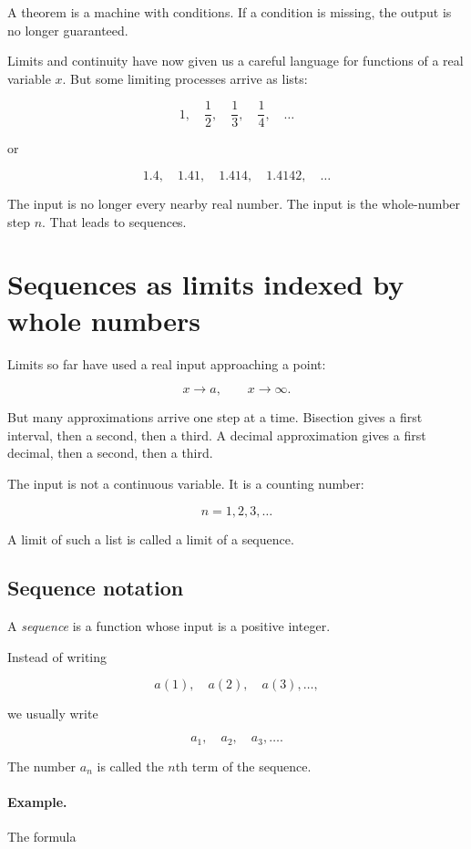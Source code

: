 A theorem is a machine with conditions.  If a condition is missing, the output is no longer guaranteed.

Limits and continuity have now given us a careful language for functions of a real variable \(x\).  But some limiting processes arrive as lists:

\[
1,\quad \frac12,\quad \frac13,\quad \frac14,\quad \ldots
\]

or

\[
1.4,\quad 1.41,\quad 1.414,\quad 1.4142,\quad \ldots
\]

The input is no longer every nearby real number.  The input is the whole-number step \(n\).  That leads to sequences.

\section{Sequences as limits indexed by whole numbers}
\label{sec:sequences-as-limits-indexed}

Limits so far have used a real input approaching a point:

\[
x\to a,
\qquad
x\to\infty.
\]

But many approximations arrive one step at a time.  Bisection gives a first interval, then a second, then a third.  A decimal approximation gives a first decimal, then a second, then a third.

The input is not a continuous variable.  It is a counting number:

\[
n=1,2,3,\ldots
\]

A limit of such a list is called a limit of a sequence.

\subsection{Sequence notation}
\label{subsec:sequence-notation}

A \emph{sequence} is a function whose input is a positive integer.

Instead of writing

\[
a(1),\quad a(2),\quad a(3),\ldots,
\]

we usually write

\[
a_1,\quad a_2,\quad a_3,\ldots.
\]

The number \(a_n\) is called the \(n\)th term of the sequence.

\paragraph{Example.}
The formula

